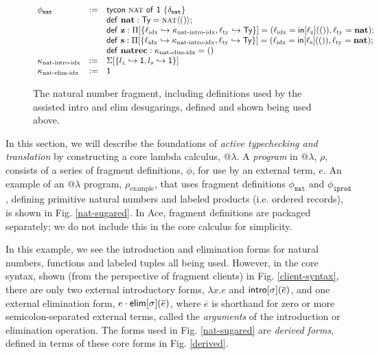 \documentclass[10pt,preprint]{sigplanconf}
\begin{document}
{\begin{figure*}
\small
$
\begin{array}{lcl}
\phi_{\texttt{nat}} & := & {\sf tycon}~\textsc{nat}~{\sf of}~\textsf{1}~\{\delta_{\texttt{nat}}\}\\
&& {\sf def}~{\textbf{nat}}:\textsf{Ty} = \textsc{nat}\langle()\rangle;\\
&& {\sf def}~{\textbf{z}}:\Pi[\{\ell_{\text{idx}}\hookrightarrow\kappa_{\text{nat-intro-idx}},\ell_{\text{ty}}\hookrightarrow\textsf{Ty}\}]={(\ell_{\text{idx}}={\sf in}[\ell_{\text{z}}](()), \ell_{\text{ty}}={\textbf{nat}})};\\
&& {\sf def}~{\textbf{s}}:\Pi[\{\ell_{\text{idx}}\hookrightarrow\kappa_{\text{nat-intro-idx}},\ell_{\text{ty}}\hookrightarrow\textsf{Ty}\}]={(\ell_{\text{idx}}={\sf in}[\ell_{\text{s}}](()), \ell_{\text{ty}}={\textbf{nat}})};\\
&& {\sf def}~{\textbf{natrec}}:\kappa_{\text{nat-elim-idx}} =()\\
\kappa_{\text{nat-intro-idx}} & := & \Sigma[\{l_z \hookrightarrow \textsf{1}, l_s \hookrightarrow \textsf{1}\}]\\
\kappa_{\text{nat-elim-idx}} & := & \textsf{1}\\
\end{array}
$
\caption{\small The natural number fragment, including definitions used by the assisted intro and elim desugarings, defined and shown being used above.}
\label{nat-atfrag}
\end{figure*}
In this section, we will describe the foundations of \emph{active typechecking and translation} by constructing a core lambda calculus, @$\lambda$. 
A \emph{program} in @$\lambda$, $\rho$, consists of a series of fragment definitions, $\phi$, for use by an external term, $e$. An example of an @$\lambda$ program, $\rho_{\text{example}}$, that uses {fragment definitions} $\phi_{\texttt{nat}}$ and $\phi_{\texttt{lprod}}$, defining primitive natural numbers and labeled products (i.e. ordered records), is shown in Fig. \ref{nat-sugared}. In Ace,  fragment definitions are packaged separately; we do not include this in the core calculus for simplicity.

In this example, we see the introduction and elimination forms for natural numbers, functions and labeled tuples all being used. However, in the core syntax, shown (from the perspective of fragment clients) in Fig. \ref{client-syntax}, there are only two external introductory forms, $\lambda x.e$ and ${\sf intro}[\sigma](\overline{e})$, and one external elimination form, $e\cdot{\sf elim}[\sigma](\overline{e})$, where $\overline{e}$ is shorthand for zero or more semicolon-separated external terms, called the \emph{arguments} of the introduction or elimination operation. The forms used in Fig. \ref{nat-sugared} are \emph{derived forms}, defined in terms of these core forms in Fig. \ref{derived}. 

}
\end{document}
